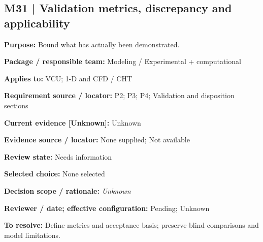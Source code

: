 \documentclass[11pt]{article}
\begin{document}
\par\noindent\begin{minipage}{\textwidth}\small\setlength{\parskip}{2pt}
\subsection*{M31 | Validation metrics, discrepancy and applicability}
\textbf{Purpose:} Bound what has actually been demonstrated.\par
\textbf{Package / responsible team:} Modeling / Experimental + computational\par
\textbf{Applies to:} VCU; 1-D and CFD / CHT\par
\textbf{Requirement source / locator:} P2; P3; P4; Validation and disposition sections\par
\textbf{Current evidence [Unknown]:} Unknown\par
\textbf{Evidence source / locator:} None supplied; Not available\par
\textbf{Review state:} Needs information\par
\textbf{Selected choice:} None selected\par
\textbf{Decision scope / rationale:} \textit{Unknown}\par
\textbf{Reviewer / date; effective configuration:} Pending; Unknown\par
\textbf{To resolve:} Define metrics and acceptance basis; preserve blind comparisons and model limitations.\par
\end{minipage}\par\vspace{5pt}
\end{document}
